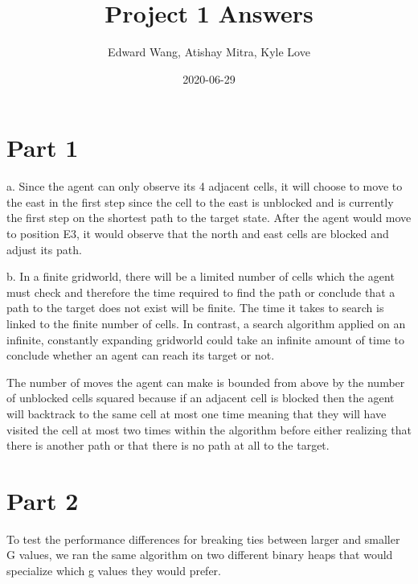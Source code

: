\documentclass{article}
\title{Project 1 Answers}
\date{2020-06-29}
\author{Edward Wang, Atishay Mitra, Kyle Love}
\begin{document}
\maketitle

\section{Part 1}
a. Since the agent can only observe its 4 adjacent cells, it will choose to move to the east in the first step since the cell to the east is unblocked and is currently the first step on the shortest path to the target state. After the agent would move to position E3, it would observe that the north and east cells are blocked and adjust its path. 

b. In a finite gridworld, there will be a limited number of cells which the agent must check and therefore the time required to find the path or conclude that a path to the target does not exist will be finite. The time it takes to search is linked to the finite number of cells. In contrast, a search algorithm applied on an infinite, constantly expanding gridworld could take an infinite amount of time to conclude whether an agent can reach its target or not.

The number of moves the agent can make is bounded from above by the number of unblocked cells squared because if an adjacent cell is blocked then the agent will backtrack to the same cell at most one time meaning that they will have visited the cell at most two times within the algorithm before either realizing that there is another path or that there is no path at all to the target. 

\section{Part 2}
To test the performance differences for breaking ties between larger and smaller G values, we ran the same algorithm on two different binary heaps that would specialize which g values they would prefer. 
\end{document}
